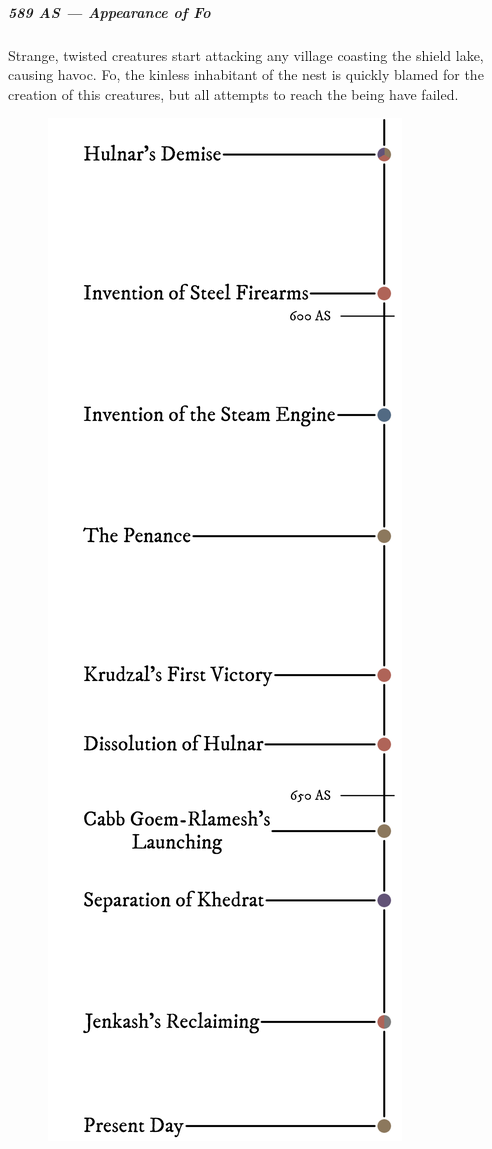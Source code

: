 \begin{linenumbers}
\subparagraph{589 AS --- Appearance of Fo} Strange, twisted creatures start attacking any village coasting the shield lake, causing havoc.
Fo, the kinless inhabitant of the nest is quickly blamed for the creation of this creatures, but all attempts to reach the being have failed.

\begin{figure}[H]
    \centering \includegraphics{01intro/img/30history_vi.png}
\end{figure}


\end{linenumbers}
